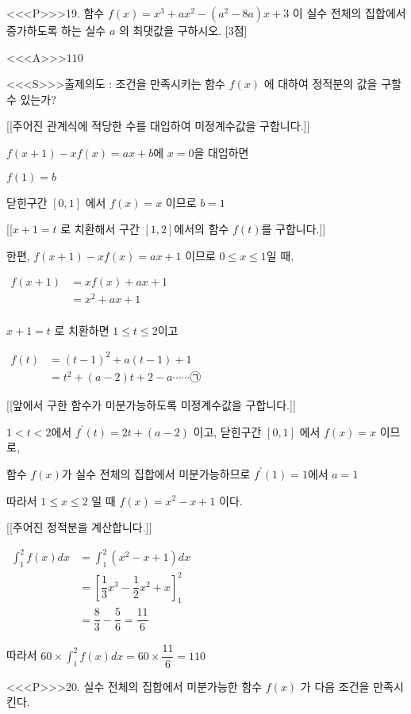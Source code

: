 \documentclass{oblivoir}
\begin{document}
<<<P>>>19. 함수 $f(x)=x^{3}+a x^{2}-\left(a^{2}-8 a\right) x+3$ 이 실수 전체의 집합에서 증가하도록 하는 실수 $a$ 의 최댓값을 구하시오. [3점]


<<<A>>>$110$

<<<S>>>출제의도 : 조건을 만족시키는 함수 $f(x)$ 에 대하여 정적분의 값을 구할 수 있는가?

[[주어진 관계식에 적당한 수를 대입하여 미정계수값을 구합니다.]]

$f(x+1)-x f(x)=a x+b$에 $x=0$을 대입하면

$f(1)=b$

닫힌구간 $[0,1]$ 에서 $f(x)=x$ 이므로 $b=1$

[[$x+1=t$ 로 치환해서 구간 $[1, 2]$에서의 함수 $f(t)$를 구합니다.]]

한편, $f(x+1)-x f(x)=a x+1$ 이므로 $0 \leq x \leq 1$일 때, 

$\begin{aligned} f(x+1) &=x f(x)+a x+1\\
&=x^{2}+a x+1\\
\end{aligned}$

$x+1=t$ 로 치환하면 $1 \leq t \leq 2$이고

$\begin{aligned} f(t) &=(t-1)^{2}+a(t-1)+1\\
&=t^{2}+(a-2) t+2-a \cdots \cdots \text{㉠} \end{aligned} $ 

[[앞에서 구한 함수가 미분가능하도록 미정계수값을 구합니다.]]

$1<t<2$에서 $f^{\prime}(t)=2 t+(a-2)$ 이고, 닫힌구간 $[0,1]$ 에서 $f(x)=x$ 이므로,

함수 $f(x)$가 실수 전체의 집합에서 미분가능하므로 $f^{\prime}(1)=1$에서 $a=1$

따라서 $1 \leq x \leq 2$ 일 때 $f(x)=x^{2}-x+1$ 이다.

[[주어진 정적분을 계산합니다.]]

$ \begin{aligned}\displaystyle\int_{1}^{2} f(x) d x &=\displaystyle\int_{1}^{2}\left(x^{2}-x+1\right) d x\\
&=\left[\dfrac{1}{3} x^{3}-\dfrac{1}{2} x^{2}+x\right]_{1}^{2}\\
&=\dfrac{8}{3}-\dfrac{5}{6}=\dfrac{11}{6}\end{aligned}$

따라서 $60 \times \displaystyle\int_{1}^{2} f(x) d x=60 \times \dfrac{11}{6} =110$


<<<P>>>20. 실수 전체의 집합에서 미분가능한 함수 $f(x)$ 가 다음 조건을 만족시킨다.
\end{document}
